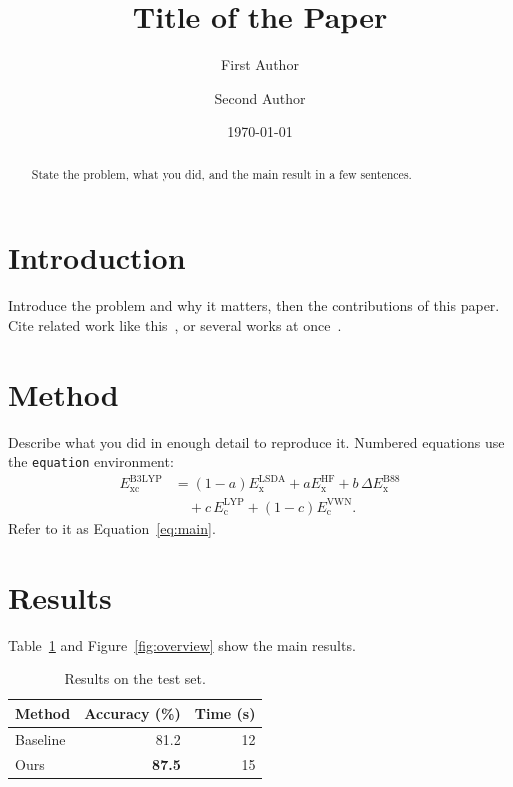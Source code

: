 \documentclass[aip,jcp,reprint,amsmath,amssymb]{revtex4-2}
\begin{document}
\title{Title of the Paper}

\author{First Author}
\author{Second Author}

\date{\today}

\begin{abstract}
State the problem, what you did, and the main result in a few sentences.
\end{abstract}

\maketitle

\section{Introduction}
\label{sec:intro}
Introduce the problem and why it matters, then the contributions of this
paper. Cite related work like this~\cite{kohn1965}, or several works at
once~\cite{kohn1965,becke1993}.

\section{Method}
\label{sec:method}
Describe what you did in enough detail to reproduce it. Numbered equations use
the \texttt{equation} environment:
\begin{equation}
  \label{eq:main}
  \begin{split}
  E_{\mathrm{xc}}^{\mathrm{B3LYP}} &= (1-a) E_{\mathrm{x}}^{\mathrm{LSDA}} + a E_{\mathrm{x}}^{\mathrm{HF}} + b\, \Delta E_{\mathrm{x}}^{\mathrm{B88}} \\
  &\quad + c\, E_{\mathrm{c}}^{\mathrm{LYP}} + (1-c) E_{\mathrm{c}}^{\mathrm{VWN}}.
  \end{split}
\end{equation}
Refer to it as Equation~\eqref{eq:main}.

\section{Results}
\label{sec:results}
Table~\ref{tab:results} and Figure~\ref{fig:overview} show the main results.

\begin{table}[htbp]
  \centering
  \caption{Results on the test set.}
  \label{tab:results}
  \begin{tabular}{lrr}
    \toprule
    Method & Accuracy (\%) & Time (s) \\
    \midrule
    Baseline & 81.2 & 12 \\
    Ours & \textbf{87.5} & 15 \\
    \bottomrule
  \end{tabular}
\end{table}
\end{document}
